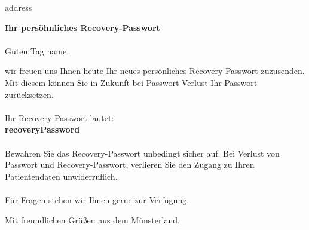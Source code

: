 \documentclass[11pt]{dinbrief}
\begin{document}
\centeraddress
{}
\signature{Ihr Nibyou Team}
\date{\today}
\begin{letter}{ {{address}} }
  \nowindowrules
  \nowindowtics
\opening{ {\Large \textbf{Ihr persöhnliches Recovery-Passwort} } \\ \ \\Guten Tag {{name}},}
wir freuen uns Ihnen heute Ihr neues persönliches Recovery-Passwort zuzusenden. Mit diesem können Sie in Zukunft bei Passwort-Verlust Ihr Passwort zurücksetzen. \\ \ \\
Ihr Recovery-Passwort lautet:\\
\textbf{ {{recoveryPassword}} }
\\ \ \\
Bewahren Sie das Recovery-Passwort unbedingt sicher auf. Bei Verlust von Passwort und Recovery-Passwort, verlieren Sie den Zugang zu Ihren Patientendaten unwiderruflich. \\ \ \\
Für Fragen stehen wir Ihnen gerne zur Verfügung.
\closing[]{Mit freundlichen Grüßen aus dem Münsterland,}
\end{letter}
\end{document}
